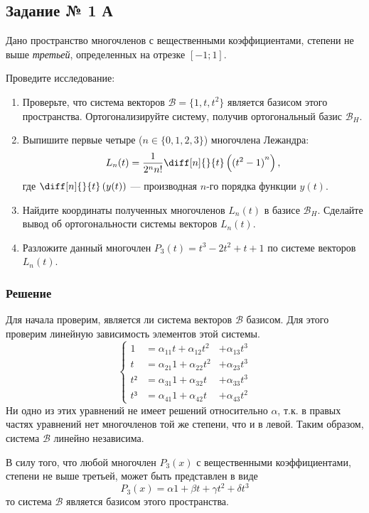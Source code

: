 \subsection{Задание № 1 А}

\newcommand{\Bs}{\mathcal{B}}
\newcommand{\BsH}{{\Bs_H}}

Дано пространство многочленов с вещественными коэффициентами,
степени не выше \textit{третьей}, определенных на отрезке \([-1; 1]\).

Проведите исследование:
\begin{enumerate}
  \item Проверьте, что система векторов \(\Bs = \{1, t, t^2\}\) является
    базисом этого пространства.
    Ортогонализируйте систему, получив ортогональный базис \(\BsH\).
  \item Выпишите первые четыре (\(n \in \{0, 1, 2, 3\}\)) многочлена Лежандра:
    \[
      L_{n}(t)
      = \frac{1}{2^{n} n!} \diff[n]{}{t}\left( {(t^2 - 1)}^{n} \right),
    \]
    где \(\diff[n]{}{t}\left( y(t) \right)\) --- производная \(n\)-го порядка
    функции \(y(t)\).
  \item Найдите координаты полученных многочленов \(L_{n}(t)\) в базисе
    \(\BsH\).
    Сделайте вывод об ортогональности системы векторов \(L_{n}(t)\).
  \item Разложите данный многочлен \(P_{3}(t) = t^3 - 2 t^2 + t + 1\)
    по системе векторов \(L_{n}(t)\).
\end{enumerate}

\subsubsection{Решение}

Для начала проверим, является ли система векторов \(\Bs\) базисом.
Для этого проверим линейную зависимость элементов этой системы.
\[
  \left\{
  \begin{aligned}
    1  &= α_{11} t + α_{12} t^2 &+ α_{13} t^3 \\
    t  &= α_{21} 1 + α_{22} t^2 &+ α_{23} t^3 \\
    t² &= α_{31} 1 + α_{32} t  &+ α_{33} t^3 \\
    t³ &= α_{41} 1 + α_{42} t  &+ α_{43} t^2
  \end{aligned}
  \right.
\]
Ни одно из этих уравнений не имеет решений относительно \(α\), т.к.
в правых частях уравнений нет многочленов той же степени, что и в левой.
Таким образом, система \(\Bs\) линейно независима.

В силу того, что любой многочлен \(P_{3}(x)\) с вещественными коэффициентами,
степени не выше третьей, может быть представлен в виде
\[P_{3}(x) = α 1 + β t + γ t^2 + δ t^3\]
то система \(\Bs\) является базисом этого пространства.

